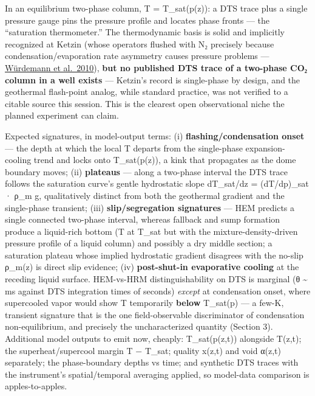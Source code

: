 In an equilibrium two-phase column, T = T\_sat(p(z)): a DTS trace plus a
single pressure gauge pins the pressure profile and locates phase fronts
--- the ``saturation thermometer.'' The thermodynamic basis is solid and
implicitly recognized at Ketzin (whose operators flushed with N₂
precisely because condensation/evaporation rate asymmetry causes
pressure problems ---
\href{https://gfzpublic.gfz-potsdam.de/pubman/item/item_242409_1/component/file_242408/15975.pdf}{Würdemann
et al.~2010}), \textbf{but no published DTS trace of a two-phase CO₂
column in a well exists} --- Ketzin's record is single-phase by design,
and the geothermal flash-point analog, while standard practice, was not
verified to a citable source this session. This is the clearest open
observational niche the planned experiment can claim.

Expected signatures, in model-output terms: (i)
\textbf{flashing/condensation onset} --- the depth at which the local T
departs from the single-phase expansion-cooling trend and locks onto
T\_sat(p(z)), a kink that propagates as the dome boundary moves; (ii)
\textbf{plateaus} --- along a two-phase interval the DTS trace follows
the saturation curve's gentle hydrostatic slope dT\_sat/dz =
(dT/dp)\_sat · ρ\_m g, qualitatively distinct from both the geothermal
gradient and the single-phase transient; (iii) \textbf{slip/segregation
signatures} --- HEM predicts a single connected two-phase interval,
whereas fallback and sump formation produce a liquid-rich bottom (T at
T\_sat but with the mixture-density-driven pressure profile of a liquid
column) and possibly a dry middle section; a saturation plateau whose
implied hydrostatic gradient disagrees with the no-slip ρ\_m(z) is
direct slip evidence; (iv) \textbf{post-shut-in evaporative cooling} at
the receding liquid surface. HEM-vs-HRM distinguishability on DTS is
marginal (θ \textasciitilde{} ms against DTS integration times of
seconds) \emph{except} at condensation onset, where supercooled vapor
would show T temporarily \textbf{below} T\_sat(p) --- a few-K, transient
signature that is the one field-observable discriminator of condensation
non-equilibrium, and precisely the uncharacterized quantity (Section 3).
Additional model outputs to emit now, cheaply: T\_sat(p(z,t)) alongside
T(z,t); the superheat/supercool margin T − T\_sat; quality x(z,t) and
void α(z,t) separately; the phase-boundary depths vs time; and synthetic
DTS traces with the instrument's spatial/temporal averaging applied, so
model-data comparison is apples-to-apples.

